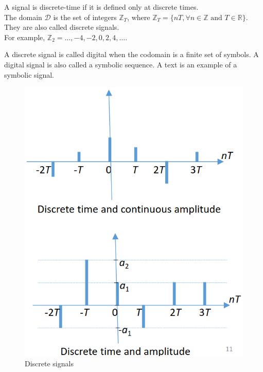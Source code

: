 \begin{paracol}{2}
   
   \begin{definition}
      A signal is discrete-time if it is defined only at discrete times.\\
      The domain $\mathcal{D}$ is the set of integers $\mathbb{Z}_T$,
      where $\mathbb{Z}_T = \{nT, \forall n \in \mathbb{Z} \text{ and } T \in \mathbb{R}\}$.
      They are also called discrete signals.\\
      For example, $\mathbb{Z}_2 = \ldots, -4, -2, 0, 2, 4, \ldots$.
      
      A discrete signal is called digital when the codomain is a finite set of symbols.
      A digital signal is also called a symbolic sequence.
      A text is an example of a symbolic signal.
      
   \end{definition}

   \switchcolumn
   \begin{figure}[htbp]
      \centering
      \includegraphics{images/signals_discrete.png}
      \caption{Discrete signals}
      \label{fig:signals_discrete}
   \end{figure}
\end{paracol}


